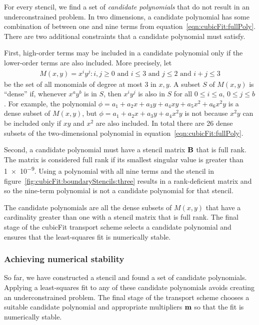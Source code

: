 For every stencil, we find a set of \textit{candidate polynomials} that do not result in an underconstrained problem.
In two dimensions, a candidate polynomial has some combination of between one and nine terms from equation~\eqref{eqn:cubicFit:fullPoly}.  There are two additional constraints that a candidate polynomial must satisfy.

First, high-order terms may be included in a candidate polynomial only if the lower-order terms are also included.
More precisely, let
\begin{align}
	M(x, y) = { x^i y^j : i,j \geq 0 \text{ and } i \leq 3 \text{ and } j \leq 2 \text{ and } i+j \leq 3}
\end{align}
be the set of all monomials of degree at most \num{3} in $x, y$.
A subset $S$ of $M(x,y)$ is ``dense'' if, whenever $x^a y^b$ is in $S$, then $x^i y^j$ is also in $S$ for all $0 \leq i \leq a$, $0 \leq j \leq b$.
For example, the polynomial $\phi = a_1 + a_2 x + a_3 y + a_4 xy + a_5 x^2 + a_6 x^2 y$ is a dense subset of $M(x,y)$, but $\phi = a_1 + a_2 x + a_3 y + a_4 x^2 y$ is not because $x^2 y$ can be included only if $xy$ and $x^2$ are also included.
In total there are 26 dense subsets of the two-dimensional polynomial in equation~\eqref{eqn:cubicFit:fullPoly}.

Second, a candidate polynomial must have a stencil matrix $\mathbf{B}$ that is full rank.  The matrix is considered full rank if its smallest singular value is greater than \num{1e-9}.
Using a polynomial with all nine terms and the stencil in figure~\ref{fig:cubicFit:boundaryStencils:three} results in a rank-deficient matrix and so the nine-term polynomial is not a candidate polynomial for that stencil.

The candidate polynomials are all the dense subsets of $M(x,y)$ that have a cardinality greater than one with a stencil matrix that is full rank.  The final stage of the cubicFit transport scheme selects a candidate polynomial and ensures that the least-squares fit is numerically stable.

\subsubsection{Achieving numerical stability}
\label{sec:cubicFit:stabilisation}
So far, we have constructed a stencil and found a set of candidate polynomials.  Applying a least-squares fit to any of these candidate polynomials avoids creating an underconstrained problem.  The final stage of the transport scheme chooses a suitable candidate polynomial and appropriate multipliers $\mathbf{m}$ so that the fit is numerically stable.

